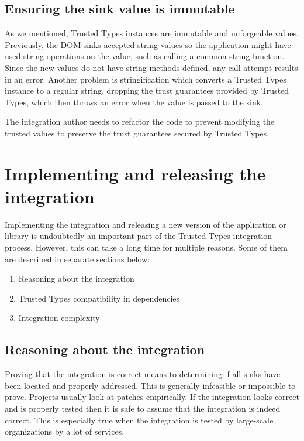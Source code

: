 \subsection{Ensuring the sink value is immutable}
\label{tt_integration_ensure_tt_not_altered}

As we mentioned, Trusted Types instances are immutable and unforgeable values. Previously, the DOM
sinks accepted string values so the application might have used string operations on the value, such
as calling a common string function. Since the new values do not have string methods defined, any
call attempt results in an error. Another problem is stringification which converts a Trusted Types
instance to a regular string, dropping the trust guarantees provided by Trusted Types, which then
throws an error when the value is passed to the sink.

The integration author needs to refactor the code to prevent modifying the trusted values to
preserve the trust guarantees secured by Trusted Types.

\section{Implementing and releasing the integration}

Implementing the integration and releasing a new version of the application or library is
undoubtedly an important part of the Trusted Types integration process. However, this can take a
long time for multiple reasons. Some of them are described in separate sections below:

\begin{enumerate}
  \item Reasoning about the integration
  \item Trusted Types compatibility in dependencies
  \item Integration complexity
\end{enumerate}

\subsection{Reasoning about the integration}
\label{sub:reason_about_integration}

Proving that the integration is correct means to determining if all sinks have been located and
properly addressed. This is generally infeasible or impossible to prove. Projects usually look at
patches empirically. If the integration looks correct and is properly tested then it is safe to
assume that the integration is indeed correct. This is especially true when the integration is
tested by large-scale organizations by a lot of services.

